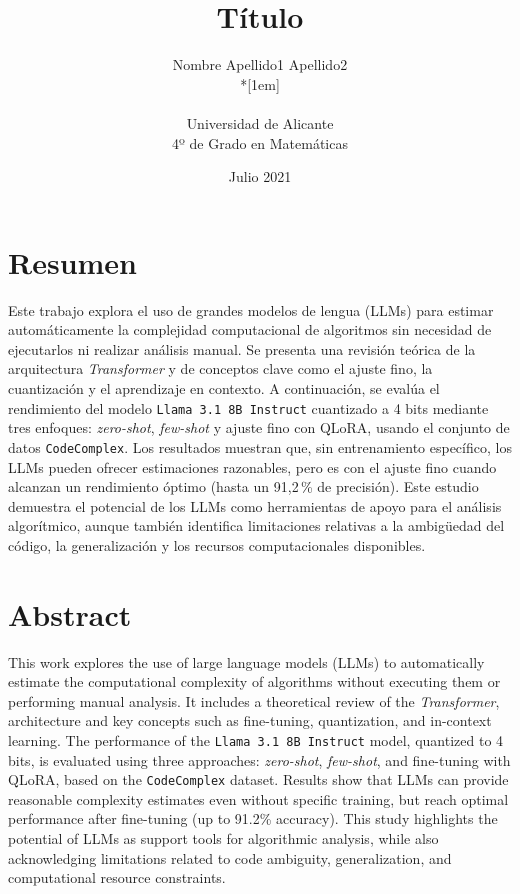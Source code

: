 \documentclass[12pt,twoside]{article}
\title{Título}
\author{Nombre Apellido1 Apellido2\\*[1em]
\begin{minipage}{0.75\textwidth}
\footnotesize \itshape
\begin{center}
Universidad de Alicante \\
4º de Grado en Matemáticas
\end{center}
\end{minipage}
}
\date{Julio 2021}
\begin{document}




\section*{Resumen}
Este trabajo explora el uso de grandes modelos de lengua (LLMs) para estimar automáticamente la complejidad computacional de algoritmos sin necesidad de ejecutarlos ni realizar análisis manual. Se presenta una revisión teórica de la arquitectura \textit{Transformer} y de conceptos clave como el ajuste fino, la cuantización y el aprendizaje en contexto. A continuación, se evalúa el rendimiento del modelo \texttt{Llama 3.1 8B Instruct} cuantizado a 4 bits mediante tres enfoques: \textit{zero-shot}, \textit{few-shot} y ajuste fino con QLoRA, usando el conjunto de datos \texttt{CodeComplex}. Los resultados muestran que, sin entrenamiento específico, los LLMs pueden ofrecer estimaciones razonables, pero es con el ajuste fino cuando alcanzan un rendimiento óptimo (hasta un 91,2\,\% de precisión). Este estudio demuestra el potencial de los LLMs como herramientas de apoyo para el análisis algorítmico, aunque también identifica limitaciones relativas a la ambigüedad del código, la generalización y los recursos computacionales disponibles.


\newpage

\section*{Abstract}
This work explores the use of large language models (LLMs) to automatically estimate the computational complexity of algorithms without executing them or performing manual analysis. It includes a theoretical review of the \textit{Transformer}, architecture and key concepts such as fine-tuning, quantization, and in-context learning. The performance of the \texttt{Llama 3.1 8B Instruct} model, quantized to 4 bits, is evaluated using three approaches: \textit{zero-shot}, \textit{few-shot}, and fine-tuning with QLoRA, based on the \texttt{CodeComplex} dataset. Results show that LLMs can provide reasonable complexity estimates even without specific training, but reach optimal performance after fine-tuning (up to 91.2\% accuracy). This study highlights the potential of LLMs as support tools for algorithmic analysis, while also acknowledging limitations related to code ambiguity, generalization, and computational resource constraints.
\end{document}
